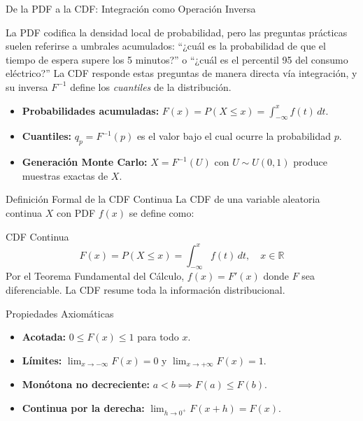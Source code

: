 \documentclass[10pt, aspectratio=169]{beamer}
\begin{document}
\begin{frame}{De la PDF a la CDF: Integración como Operación Inversa}
  \footnotesize
  \begin{motivacion}
    La PDF codifica la densidad local de probabilidad, pero las preguntas prácticas suelen referirse a umbrales acumulados: ``¿cuál es la probabilidad de que el tiempo de espera supere los 5 minutos?'' o ``¿cuál es el percentil 95 del consumo eléctrico?'' La CDF responde estas preguntas de manera directa vía integración, y su inversa $F^{-1}$ define los \emph{cuantiles} de la distribución.
  \end{motivacion}

  \vspace{0.15cm}
  \pause
  \begin{itemize}\itemsep=0.1cm
    \item \textbf{Probabilidades acumuladas:} $F(x) = P(X \le x) = \int_{-\infty}^{x} f(t)\,dt$. \pause
    \item \textbf{Cuantiles:} $q_{p} = F^{-1}(p)$ es el valor bajo el cual ocurre la probabilidad $p$. \pause
    \item \textbf{Generación Monte Carlo:} $X = F^{-1}(U)$ con $U \sim U(0, 1)$ produce muestras exactas de $X$.
  \end{itemize}
\end{frame}

\begin{frame}{Definición Formal de la CDF Continua}
  \footnotesize
  La CDF de una variable aleatoria continua $X$ con PDF $f(x)$ se define como: \pause

  \vspace{0.1cm}
  \begin{block}{CDF Continua}
    $$F(x) = P(X \le x) = \int_{-\infty}^{x} f(t)\,dt, \quad x \in \mathbb{R}$$
    Por el Teorema Fundamental del Cálculo, $f(x) = F'(x)$ donde $F$ sea diferenciable. La CDF resume toda la información distribucional.
  \end{block}

  \vspace{0.1cm}
  \pause
  \begin{alertblock}{Propiedades Axiomáticas}
    \begin{itemize}\itemsep=0.05cm
      \item \textbf{Acotada:} $0 \le F(x) \le 1$ para todo $x$.
      \item \textbf{Límites:} $\lim_{x \to -\infty} F(x) = 0$ y $\lim_{x \to +\infty} F(x) = 1$.
      \item \textbf{Monótona no decreciente:} $a < b \implies F(a) \le F(b)$.
      \item \textbf{Continua por la derecha:} $\lim_{h \to 0^{+}} F(x + h) = F(x)$.
    \end{itemize}
  \end{alertblock}
\end{frame}
\end{document}
